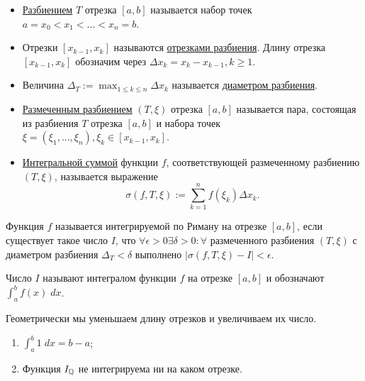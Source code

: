 	\begin{definition}
		\begin{itemize}
			
			\item \underline{Разбиением} $T$ отрезка $[a, b]$ называется набор точек
			$a = x_0 < x_1 < ... < x_n = b$.
			
			\item Отрезки $[x_{k - 1}, x_k]$ называются \underline{отрезками разбиения}. Длину отрезка $[x_{k - 1}, x_k]$ обозначим через $\Delta x_k = x_k - x_{k - 1}, k \geqslant 1$.
			
			\item Величина $\Delta_T := \displaystyle \max_{1 \leqslant k \leqslant n} \Delta x_k$ называется \underline{диаметром разбиения}.
			
			\item \underline{Размеченным разбиением} $(T, \xi)$ отрезка $[a, b]$ называется пара, состоящая из разбиения $T$ отрезка $[a, b]$ и набора точек $\xi = (\xi_1, ..., \xi_n), \xi_k \in [x_{k - 1}, x_k]$.
			
			\item \underline{Интегральной суммой} функции $f$, соответствующей размеченному разбиению $(T, \xi)$, называется выражение
			\[ \sigma(f, T, \xi) := \sum^{n}_{k = 1} f(\xi_k) \Delta x_k. \]
		\end{itemize}
	\end{definition}
	
	\begin{definition}
		Функция $f$ называется интегрируемой по Риману на отрезке
		$[a, b]$, если существует такое число $I$, что $\forall \epsilon > 0 \exists \delta > 0: \forall$ размеченного разбиения $(T, \xi)$ с диаметром разбиения $\Delta_T < \delta$ выполнено $|\sigma(f, T, \xi) - I| < \epsilon$.
		
		Число $I$ называют интегралом функции $f$ на отрезке $[a, b]$ и
		обозначают $\displaystyle\int^{b}_{a} f(x) \; dx$.
	\end{definition}
	
	\begin{explanation}
		Геометрически мы уменьшаем длину отрезков и увеличиваем их число.
	\end{explanation}
	
	\begin{example}
		\begin{enumerate}
			\item $\displaystyle\int^{b}_{a} 1 \; dx = b - a$;
			\item Функция $I_{\mathbb Q}$ не интегрируема ни на каком отрезке.
		\end{enumerate}	
	\end{example}
	
